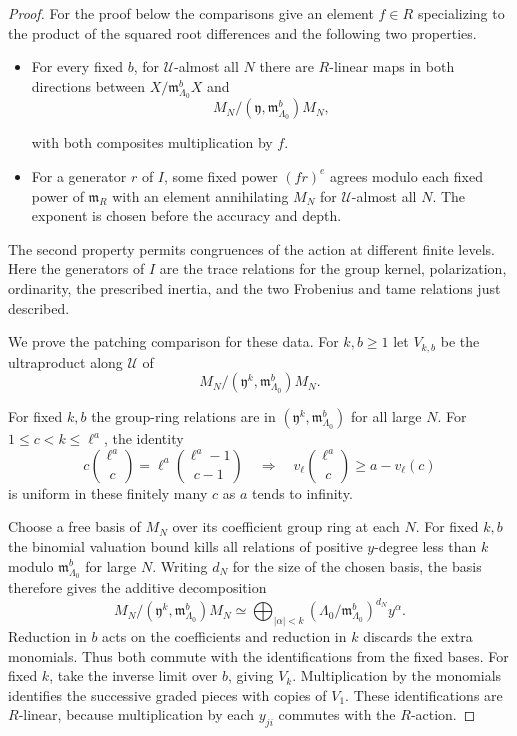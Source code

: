\begin{proof}
For the proof below the comparisons give an element
\(f\in R\) specializing to the product of the squared
root differences and the following two properties.
\begin{itemize}
\item For every fixed \(b\), for \(\mathcal U\)-almost
all \(N\) there are \(R\)-linear maps in both directions
between \(X/\mathfrak m_{\Lambda_0}^bX\) and
\[
 M_N/(\mathfrak y,\mathfrak m_{\Lambda_0}^b)M_N,
\]

with both composites multiplication by \(f\).
\item For a generator \(r\) of \(I\), some fixed power
\((fr)^e\) agrees modulo each fixed power of \(\mathfrak m_R\)
with an element annihilating \(M_N\) for
\(\mathcal U\)-almost all \(N\). The exponent is chosen
before the accuracy and depth.
\end{itemize}
The second property permits congruences of the action at
different finite levels. Here the generators of \(I\) are the trace relations for the group kernel,
polarization, ordinarity, the prescribed inertia, and
the two Frobenius and tame relations just described.

We prove the patching comparison for these data.
For \(k,b\ge1\) let \(V_{k,b}\) be the ultraproduct
along \(\mathcal U\) of
\[
 M_N/(\mathfrak y^k,\mathfrak m_{\Lambda_0}^b)M_N.
\]

For fixed \(k,b\) the group-ring relations are in
\((\mathfrak y^k,\mathfrak m_{\Lambda_0}^b)\) for all
large \(N\). For \(1\le c<k\le\ell^a\), the identity
\[
 c\binom{\ell^a}{c}=\ell^a\binom{\ell^a-1}{c-1}
 \quad\Longrightarrow\quad
 v_\ell\binom{\ell^a}{c}\ge a-v_\ell(c)
\]
is uniform in these finitely many \(c\) as \(a\) tends to infinity.

Choose a free basis of \(M_N\) over its coefficient group
ring at each \(N\). For fixed \(k,b\) the binomial valuation
bound kills all relations of positive \(y\)-degree less than
\(k\) modulo \(\mathfrak m_{\Lambda_0}^b\) for large \(N\).
Writing \(d_N\) for the size of the chosen basis, the
basis therefore gives the additive decomposition
\[
 M_N/(\mathfrak y^k,\mathfrak m_{\Lambda_0}^b)M_N
   \simeq\bigoplus_{|\alpha|<k}
       (\Lambda_0/\mathfrak m_{\Lambda_0}^b)^{d_N}y^\alpha .
\]
Reduction in \(b\) acts on the coefficients and reduction
in \(k\) discards the extra monomials. Thus both commute with
the identifications from the fixed bases. For fixed \(k\), take the inverse limit
over \(b\), giving \(V_k\). Multiplication by the monomials
identifies the successive graded pieces with copies of
\(V_1\). These identifications are \(R\)-linear, because
multiplication by each \(y_{ji}\) commutes with the
\(R\)-action.


\end{proof}
